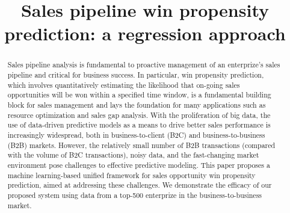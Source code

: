 \documentclass[10pt,conference]{IEEEtran}
\begin{document}
\title{Sales pipeline win propensity prediction: a regression approach}


\author{
\and
{}
\and
{}
\and
{}
\and
{}


}








\maketitle


\begin{abstract}
Sales pipeline analysis is fundamental to proactive management of an enterprize's sales pipeline and critical for business success. In particular, win propensity prediction, which involves quantitatively estimating the likelihood that on-going sales opportunities will be won within a specified time window, is a fundamental building block for sales management and lays the foundation for many applications such as resource optimization and sales gap analysis. With the proliferation of big data, the use of data-driven predictive models as a means to drive better sales performance is increasingly widespread, both in business-to-client (B2C) and business-to-business (B2B) markets. However, the relatively small number of B2B transactions (compared with the volume of B2C transactions), noisy data, and the fast-changing market environment pose challenges to effective predictive modeling. This paper proposes a machine learning-based unified framework for sales opportunity win propensity prediction, aimed at addressing these challenges. We demonstrate the efficacy of our proposed system using data from a top-500 enterprize in the business-to-business market.
\end{abstract}
\end{document}
